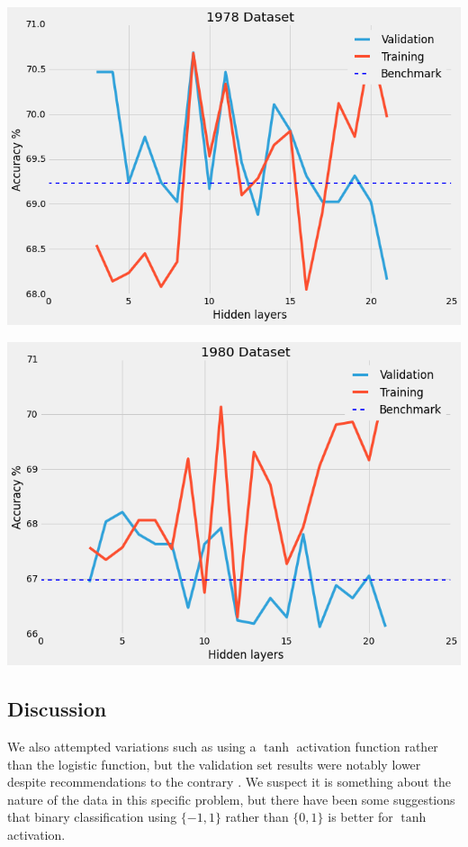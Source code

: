 \documentclass[a4paper]{article}
\theoremstyle{plain}
\begin{document}
\begin{center}\vspace{1cm}
\includegraphics[width=0.9\linewidth]{1978}
\end{center}\vspace{1cm}

\begin{center}\vspace{1cm}
\includegraphics[width=0.9\linewidth]{1980}
\end{center}\vspace{1cm}

\subsection{Discussion}

We also attempted variations such as using a $\tanh$ activation function rather than the logistic function, but the validation set results were notably lower despite recommendations to the contrary \cite{lecun-98b}. We suspect it is something about the nature of the data in this specific problem, but there have been some suggestions that binary classification using $\{-1, 1\}$ rather than $\{0, 1\}$ is better for $\tanh$ activation.\cite{lecun-98b}
\end{document}
